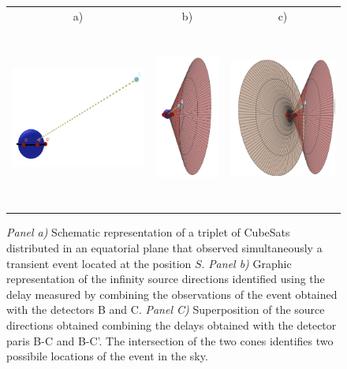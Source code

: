 \documentclass[]{spie}  %
\begin{document}
\begin{figure}
\begin{center}
\begin{tabular}{ccc}
a) & b) & c)\\
\includegraphics[height=5cm]{trinag_fig1} &
\includegraphics[height=6cm]{triang_fig2} &
\includegraphics[height=6cm]{triang_fig3} \\
\end{tabular}
\end{center}
\caption[example] 
{ \label{fig:triangulation2} 
\emph{Panel a)} Schematic representation of a triplet of CubeSats distributed in an equatorial plane that observed simultaneously a transient event located at the position $S$. \emph{Panel b)} Graphic representation of the infinity source directions identified using the delay measured by combining the observations of the event obtained with the detectors B and C. \emph{Panel C)} Superposition of the source directions obtained combining the delays obtained with the detector paris B-C and B-C'. The intersection of the two cones identifies two possibile locations of the event in the sky.}
\end{figure}
\end{document}
